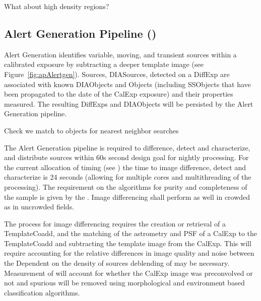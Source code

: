 \begin{note} What about high density regions? \end{note}

\subsection{Alert Generation Pipeline (\wbsDiffim)}
\label{sec:apAlertGeneration}

Alert Generation identifies variable, moving, and transient sources within a calibrated exposure by subtracting a deeper template image (see Figure~\ref{fig:apAlertgen}). Sources, DIASources, detected on a DiffExp are associated with known DIAObjects and Objects (including SSObjects that have been propagated to the date of the CalExp exposure) and their properties measured. The resulting DiffExps and DIAObjects will be persisted by the Alert Generation pipeline.
\begin{note} Check we match to objects for nearest neighbor searches \end{note}

The Alert Generation pipeline is required to difference, detect and characterize, and distribute sources within 60s second design goal for nightly processing. For the current allocation of timing (see \hyperref[]{}) the time to image difference, detect and characterize  \DIASources is 24 seconds (allowing for multiple cores and multithreading of the processing). The requirement on the algorithms for purity and completeness of the sample is given by the \DMSR\@. Image differencing shall perform as well in crowded as in uncrowded fields. 

The process for image differencing requires the creation or retrieval of a TemplateCoadd, and the matching of the  astrometry and PSF of a CalExp to the TemplateCoadd and subtracting the template image from the CalExp. This will require accounting for the relative differences in image quality and noise between the Dependent on the density of sources deblending of \DIASources may be necessary. Measurement of \DIASources will account for whether the CalExp image was preconvolved or not and spurious \DIASources will be removed using morphological and environment based classification algorithms. 

